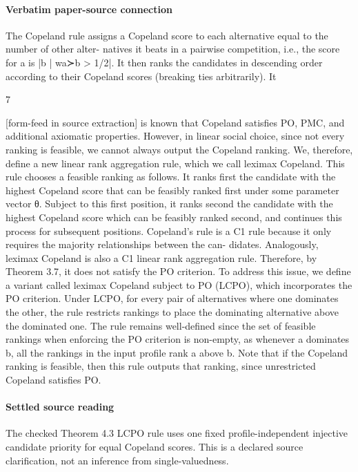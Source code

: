 \documentclass[10pt]{article}
\begin{document}
\paragraph{Verbatim paper-source connection}
\begin{ReviewVerbatim}
The Copeland rule assigns a Copeland score to each alternative equal to the number of other alter-
natives it beats in a pairwise competition, i.e., the score for a is |{b | wa≻b > 1/2}|. It then ranks
the candidates in descending order according to their Copeland scores (breaking ties arbitrarily). It


                                                     7

[form-feed in source extraction]
is known that Copeland satisfies PO, PMC, and additional axiomatic properties. However, in linear
social choice, since not every ranking is feasible, we cannot always output the Copeland ranking.
We, therefore, define a new linear rank aggregation rule, which we call leximax Copeland. This
rule chooses a feasible ranking as follows. It ranks first the candidate with the highest Copeland
score that can be feasibly ranked first under some parameter vector θ. Subject to this first position,
it ranks second the candidate with the highest Copeland score which can be feasibly ranked second,
and continues this process for subsequent positions.
Copeland’s rule is a C1 rule because it only requires the majority relationships between the can-
didates. Analogously, leximax Copeland is also a C1 linear rank aggregation rule. Therefore, by
Theorem 3.7, it does not satisfy the PO criterion. To address this issue, we define a variant called
leximax Copeland subject to PO (LCPO), which incorporates the PO criterion. Under LCPO, for
every pair of alternatives where one dominates the other, the rule restricts rankings to place the
dominating alternative above the dominated one.
The rule remains well-defined since the set of feasible rankings when enforcing the PO criterion is
non-empty, as whenever a dominates b, all the rankings in the input profile rank a above b. Note that
if the Copeland ranking is feasible, then this rule outputs that ranking, since unrestricted Copeland
satisfies PO.
\end{ReviewVerbatim}

\paragraph{Settled source reading}
\begin{sloppypar}
The checked Theorem 4.\allowbreak{}3 LCPO rule uses one fixed profile-\allowbreak{}independent injective candidate priority for equal Copeland scores.\allowbreak{} This is a declared source clarification, not an inference from single-\allowbreak{}valuedness.\allowbreak{}
\end{sloppypar}
\end{document}
